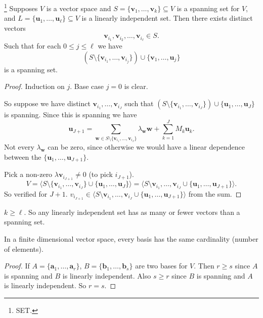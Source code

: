 \documentclass[10pt, a4paper]{article}
\newcommand{\mbf}[1]{\mathbf{#1}}
\begin{document}
\begin{theorem}\footnote{SET.}
    Supposes $V$ is a vector space and $S = \{\mbf{v}_1, \dotsc, \mbf{v}_k\} \subseteq V$ is a spanning set for $V$,
    and $L = \{\mbf{u}_1, \dotsc, \mbf{u}_{\ell}\} \subseteq V$ is a linearly independent set.
    Then there exists distinct vectors
    \[
    \mbf{v}_{i_1}, \mbf{v}_{i_2}, \dotsc, \mbf{v}_{i_{\ell}} \in S.
    \]
    Such that for each $0 \leq j \leq \ell$ we have
    \[
    \left(S \setminus \{\mbf{v}_{i_1}, \dotsc, \mbf{v}_{i_j}\}\right) \cup \{\mbf{v}_1, \dotsc, \mbf{u}_j\}
    \]
    is a spanning set.
    \begin{proof}
        Induction on $j$.
        Base case $j = 0$ is clear.

        So suppose we have distinct $\mbf{v}_{i_1}, \dotsc, \mbf{v}_{i_J}$ such that
        $(S \setminus \{\mbf{v}_{i_1}, \dotsc, \mbf{v}_{i_J}\}) \cup \{\mbf{u}_1, \dotsc, \mbf{u}_J\}$ is spanning.
        Since this is spanning we have
        \[
        \mbf{u}_{J + 1} = \sum_{\mbf{w} \in S \setminus \{\mbf{v}_{i_1}, \dotsc, \mbf{v}_{i_J}\}}\lambda_{\mbf{w}}\mbf{w} + \sum_{k = 1}^{J}M_k\mbf{u}_k.
        \]
        Not every $\lambda_{\mbf{w}}$ can be zero,
        since otherwise we would have a linear dependence between the $\{\mbf{u}_1, \dotsc, \mbf{u}_{J + 1}\}$.

        Pick a non-zero $\lambda\mbf{v}_{i_{J + 1}} \neq 0$
        (to pick $i_{J + 1}$).
        \[
        V = \langle S \setminus \{\mbf{v}_{i_1}, \dotsc, \mbf{v}_{i_J}\} \cup \{\mbf{u}_1, \dotsc, \mbf{u}_J\}\rangle = \langle S \setminus\mbf{v}_{i_1}, \dotsc, \mbf{v}_{i_J}\cup \{\mbf{u}_{1}, \dotsc, \mbf{u}_{J + 1}\}\rangle.
        \]
        So verified for $J + 1$.
        $v_{i_{J + 1}} \in \langle S \setminus\mbf{v}_{i_1}, \dotsc, \mbf{v}_{i_J}\cup \{\mbf{u}_{1}, \dotsc, \mbf{u}_{J + 1}\}\rangle$ from the sum.
    \end{proof}
\end{theorem}

\begin{corollary}
    $k \geq \ell$.
    So any linearly independent set has as many or fewer vectors than a spanning set.
\end{corollary}

\begin{corollary}
    In a finite dimensional vector space,
    every basis has the same cardinality
    (number of elements).
    \begin{proof}
        If $A = \{\mbf{a}_1, \dotsc, \mbf{a}_r\}$,
        $B = \{\mbf{b}_1, \dotsc, \mbf{b}_s\}$ are two bases for $V$.
        Then $r \geq s$ since $A$ is spanning and $B$ is linearly independent.
        Also $s \geq r$ since $B$ is spanning and $A$ is linearly independent.
        So $r = s$.
    \end{proof}
\end{corollary}
\end{document}
